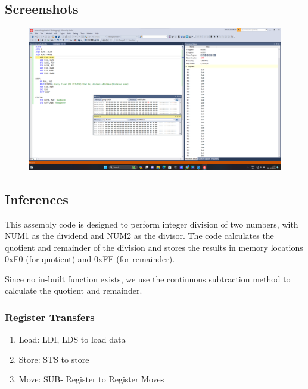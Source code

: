 \documentclass[titlepage, 11pt]{article}
\begin{document}
\subsection{Screenshots}
\begin{figure}[H]
  \centering
  \includegraphics[width=1\linewidth]{prob2.png}
\end{figure}

\subsection{Inferences}
This assembly code is designed to perform integer division of two numbers, with NUM1 as the dividend and NUM2 as the divisor. The code calculates the quotient and remainder of the division and stores the results in memory locations 0xF0 (for quotient) and 0xFF (for remainder).

Since no in-built function exists, we use the continuous subtraction method to calculate the quotient and remainder.

\subsubsection{Register Transfers}
\begin{enumerate}
\item Load: LDI, LDS to load data
\item Store: STS to store
\item Move: SUB- Register to Register Moves
\end{enumerate}
\end{document}
